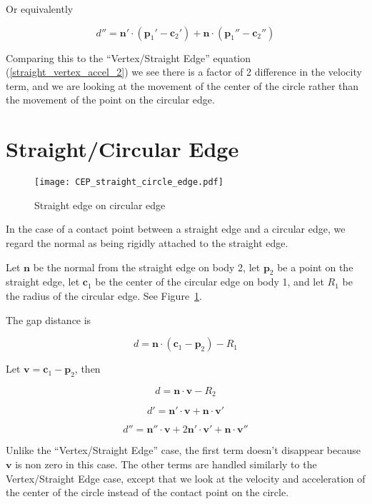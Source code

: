 \documentclass[final]{article}
\begin{document}
Or equivalently

\begin{equation}\label{accel_vertex_circle}
  d'' = \mathbf{n}' \cdot (\mathbf{p}_1' - \mathbf{c}_2')
    + \mathbf{n} \cdot (\mathbf{p}_1'' - \mathbf{c}_2'')
\end{equation}

Comparing this to the ``Vertex/Straight Edge'' equation (\ref{straight_vertex_accel_2})
we see there is a factor of 2 difference in the velocity term, and we are looking at the
movement of the center of the circle rather than the movement of the point on the
circular edge.



\section{Straight/Circular Edge}

\begin{figure}[ht]
    \centering
    \texttt{[image: CEP\_straight\_circle\_edge.pdf]}
    \caption{Straight edge on circular edge}
    \label{fig:straight_circle_edge}
\end{figure}

In the case of a contact point between a straight edge and a circular edge, we regard
the normal as being rigidly attached to the straight edge.

Let $\mathbf{n}$ be the normal from the straight edge on body 2, let $\mathbf{p}_2$ be a
point on the straight edge, let $\mathbf{c}_1$ be the center of the circular edge on
body 1, and let $R_1$ be the radius of the circular edge. See
Figure~\ref{fig:straight_circle_edge}.

The gap distance is

\[
  d = \mathbf{n} \cdot (\mathbf{c}_1 - \mathbf{p}_2) - R_1
\]

Let $\mathbf{v} = \mathbf{c}_1 - \mathbf{p}_2$, then

\[
  d = \mathbf{n} \cdot \mathbf{v}  - R_2
\]

\[
  d' = \mathbf{n}' \cdot \mathbf{v} + \mathbf{n} \cdot \mathbf{v}'
\]

\begin{equation}\label{straight_circle_accel}
  d'' = \mathbf{n}'' \cdot \mathbf{v} + 2 \mathbf{n}' \cdot \mathbf{v}'
      + \mathbf{n} \cdot \mathbf{v}''
\end{equation}

Unlike the ``Vertex/Straight Edge'' case, the first term doesn't disappear because
$\mathbf{v}$ is non zero in this case. The other terms are handled similarly to the
Vertex/Straight Edge case, except that we look at the velocity and acceleration of the
center of the circle instead of the contact point on the circle.
\end{document}
